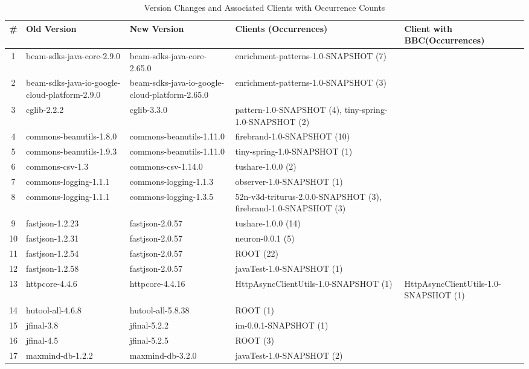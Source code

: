 \begin{table*}[hbt!]
\centering
\caption{Version Changes and Associated Clients with Occurrence Counts}
\label{tab:version-changes}
\begin{tabular}{c >{\raggedright\arraybackslash}p{3.5cm} >{\raggedright\arraybackslash}p{3.5cm} >{\raggedright\arraybackslash}p{6cm} >{\centering\arraybackslash}p{2cm}}
\toprule
\# & \textbf{Old Version} & \textbf{New Version} & \textbf{Clients (Occurrences)} & \textbf{Client with BBC(Occurrences)} \\
\midrule
1 & beam-sdks-java-core-2.9.0 & beam-sdks-java-core-2.65.0 & enrichment-patterns-1.0-SNAPSHOT (7) & \\
2 & beam-sdks-java-io-google-cloud-platform-2.9.0 & beam-sdks-java-io-google-cloud-platform-2.65.0 & enrichment-patterns-1.0-SNAPSHOT (3) & \\
3 & cglib-2.2.2 & cglib-3.3.0 & pattern-1.0-SNAPSHOT (4), tiny-spring-1.0-SNAPSHOT (2) & \\
4 & commons-beanutils-1.8.0 & commons-beanutils-1.11.0 & firebrand-1.0-SNAPSHOT (10) & \\
5 & commons-beanutils-1.9.3 & commons-beanutils-1.11.0 & tiny-spring-1.0-SNAPSHOT (1) & \\
6 & commons-csv-1.3 & commons-csv-1.14.0 & tushare-1.0.0 (2) & \\
7 & commons-logging-1.1.1 & commons-logging-1.1.3 & observer-1.0-SNAPSHOT (1) & \\
8 & commons-logging-1.1.1 & commons-logging-1.3.5 & 52n-v3d-triturus-2.0.0-SNAPSHOT (3), firebrand-1.0-SNAPSHOT (3) & \\
9 & fastjson-1.2.23 & fastjson-2.0.57 & tushare-1.0.0 (14) & \\
10 & fastjson-1.2.31 & fastjson-2.0.57 & neuron-0.0.1 (5) & \\
11 & fastjson-1.2.54 & fastjson-2.0.57 & ROOT (22) & \\
12 & fastjson-1.2.58 & fastjson-2.0.57 & javaTest-1.0-SNAPSHOT (1) & \\
13 & httpcore-4.4.6 & httpcore-4.4.16 & HttpAsyncClientUtils-1.0-SNAPSHOT (1) & HttpAsyncClientUtils-1.0-SNAPSHOT (1)\\
14 & hutool-all-4.6.8 & hutool-all-5.8.38 & ROOT (1) & \\
15 & jfinal-3.8 & jfinal-5.2.2 & im-0.0.1-SNAPSHOT (1) & \\
16 & jfinal-4.5 & jfinal-5.2.5 & ROOT (3) & \\
17 & maxmind-db-1.2.2 & maxmind-db-3.2.0 & javaTest-1.0-SNAPSHOT (2) & \\

\end{tabular}
\end{table*}
